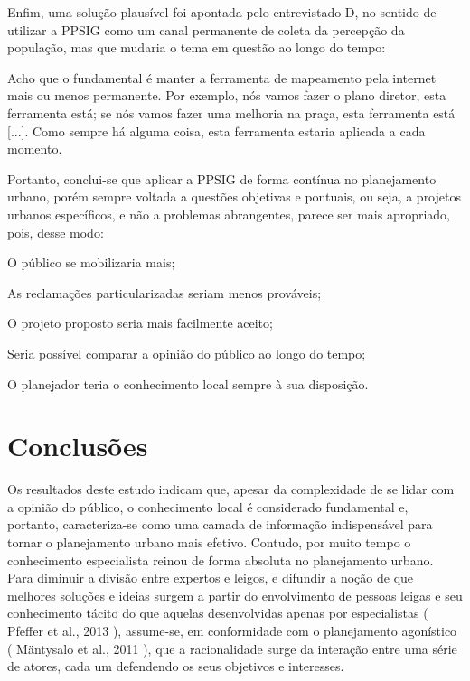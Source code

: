 \documentclass{article}
\begin{document}
Enfim, uma solução plausível foi apontada pelo entrevistado D, no sentido de
					utilizar a PPSIG como um canal permanente de coleta da percepção da população,
					mas que mudaria o tema em questão ao longo do tempo: 

Acho que o fundamental é manter a ferramenta de mapeamento pela internet mais
						ou menos permanente. Por exemplo, nós vamos fazer o plano diretor, esta
						ferramenta está; se nós vamos fazer uma melhoria na praça, esta ferramenta
						está %
[...].%
 Como sempre há alguma coisa, esta ferramenta
						estaria aplicada a cada momento.

Portanto, conclui-se que aplicar a PPSIG de forma contínua no planejamento
					urbano, porém sempre voltada a questões objetivas e pontuais, ou seja, a
					projetos urbanos específicos, e não a problemas abrangentes, parece ser mais
					apropriado, pois, desse modo:

O público se mobilizaria mais;

As reclamações particularizadas seriam menos prováveis;

O projeto proposto seria mais facilmente aceito;

Seria possível comparar a opinião do público ao longo do tempo;

O planejador teria o conhecimento local sempre à sua disposição.

\section{%
Conclusões}

Os resultados deste estudo indicam que, apesar da complexidade de se lidar com a
				opinião do público, o conhecimento local é considerado fundamental e, portanto,
				caracteriza-se como uma camada de informação indispensável para tornar o
				planejamento urbano mais efetivo. Contudo, por muito tempo o conhecimento
				especialista reinou de forma absoluta no planejamento urbano. Para diminuir a
				divisão entre expertos e leigos, e difundir a noção de que melhores soluções e
				ideias surgem a partir do envolvimento de pessoas leigas e seu conhecimento tácito
				do que aquelas desenvolvidas apenas por especialistas (%
Pfeffer et al., 2013%
), assume-se, em conformidade com o
				planejamento agonístico (%
Mäntysalo et al.,
					2011%
), que a racionalidade surge da interação entre uma série de atores,
				cada um defendendo os seus objetivos e interesses.
\end{document}
